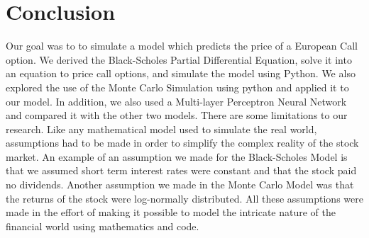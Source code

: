 \section{Conclusion}
Our goal was to to simulate a model which predicts the price of a European Call option.  We derived the Black-Scholes Partial Differential Equation, solve it into an equation to price call options, and simulate the model using Python. We also explored the use of the Monte Carlo Simulation using python and applied it to our model. In addition, we also used a Multi-layer Perceptron Neural Network and compared it with the other two models. There are some limitations to our research. Like any mathematical model used to simulate the real world, assumptions had to be made in order to simplify the complex reality of the stock market. An example of an assumption we made for the Black-Scholes Model is that we assumed short term interest rates were constant and that the stock paid no dividends. Another assumption we made in the Monte Carlo Model was that the returns of the stock were log-normally distributed. All these assumptions were made in the effort of making it possible to model the intricate nature of the financial world using mathematics and code. 